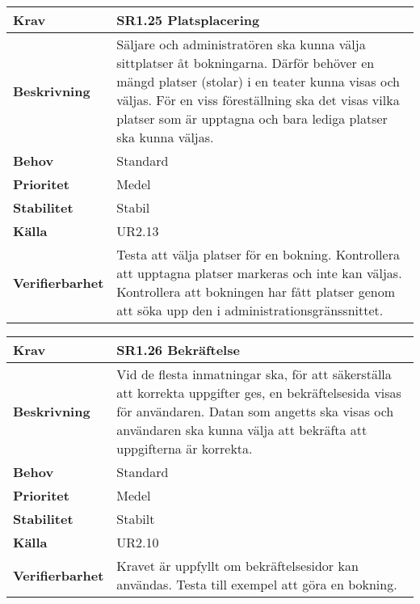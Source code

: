 \documentclass[a4paper, twoside, 11pt, titlepage]{article}
\begin{document}
		\begin {table} [ht] \begin{tabular} { p{2.6cm} p{12.5cm} }
			\hline
			\sffamily\textbf{Krav} & \sffamily\textbf{SR1.25 Platsplacering } \\
			\hline
			\sffamily\textbf{Beskrivning} & Säljare och administratören ska kunna välja sittplatser åt bokningarna. Därför behöver en mängd platser (stolar) i en teater kunna visas och väljas. För en viss föreställning ska det visas vilka platser som är upptagna och bara lediga platser ska kunna väljas.  \\
			\hline
			\sffamily\textbf{Behov} & Standard  \\
			\hline
			\sffamily\textbf{Prioritet} & Medel  \\
			\hline
			\sffamily\textbf{Stabilitet} & Stabil  \\
			\hline
			\sffamily\textbf{Källa} & UR2.13  \\
			\hline
			\sffamily\textbf{Verifierbarhet} & Testa att välja platser för en bokning. Kontrollera att upptagna platser markeras och inte kan väljas. Kontrollera att bokningen har fått platser genom att söka upp den i administrationsgränssnittet.  \\
			\hline
		\end{tabular} \end{table} \FloatBarrier
		\vspace{6mm}

		\begin {table} [ht] \begin{tabular} { p{2.6cm} p{12.5cm} }
			\hline
			\sffamily\textbf{Krav} & \sffamily\textbf{SR1.26 Bekräftelse } \\
			\hline
			\sffamily\textbf{Beskrivning} & Vid de flesta inmatningar ska, för att säkerställa att korrekta uppgifter ges, en bekräftelsesida visas för användaren. Datan som angetts ska visas och användaren ska kunna välja att bekräfta att uppgifterna är korrekta.  \\
			\hline
			\sffamily\textbf{Behov} & Standard  \\
			\hline
			\sffamily\textbf{Prioritet} & Medel  \\
			\hline
			\sffamily\textbf{Stabilitet} & Stabilt  \\
			\hline
			\sffamily\textbf{Källa} & UR2.10  \\
			\hline
			\sffamily\textbf{Verifierbarhet} & Kravet är uppfyllt om bekräftelsesidor kan användas. Testa till exempel att göra en bokning.  \\
			\hline
		\end{tabular} \end{table} \FloatBarrier
		\vspace{6mm}
\end{document}
